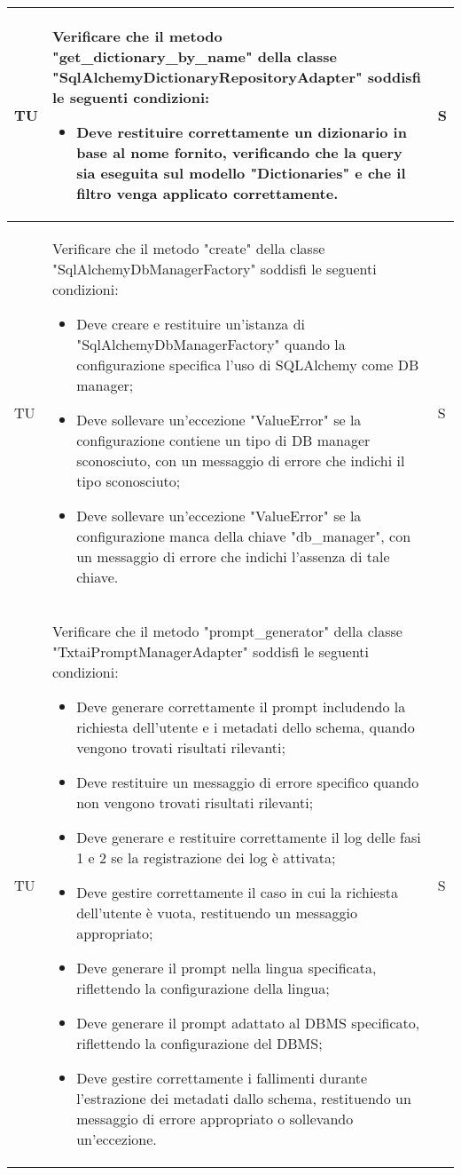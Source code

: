 \begin{adjustwidth}{-0.5cm}{-0.5cm}
\begin{longtable}{|P{1.5cm}|>{\raggedright}P{9.5cm}|>{\arraybackslash}P{1.5cm}|}
		\hline TU & Verificare che il metodo "get\_dictionary\_by\_name" della classe "SqlAlchemyDictionaryRepositoryAdapter" soddisfi le seguenti condizioni:
		\begin{itemize}
			\item Deve restituire correttamente un dizionario in base al nome fornito, verificando che la query sia eseguita sul modello "Dictionaries" e che il filtro venga applicato correttamente.
		\end{itemize} & S \\

		\hline TU & Verificare che il metodo "create" della classe "SqlAlchemyDbManagerFactory" soddisfi le seguenti condizioni:
		\begin{itemize}
			\item Deve creare e restituire un'istanza di "SqlAlchemyDbManagerFactory" quando la configurazione specifica l'uso di SQLAlchemy come DB manager;
			\item Deve sollevare un'eccezione "ValueError" se la configurazione contiene un tipo di DB manager sconosciuto, con un messaggio di errore che indichi il tipo sconosciuto;
			\item Deve sollevare un'eccezione "ValueError" se la configurazione manca della chiave "db\_manager", con un messaggio di errore che indichi l'assenza di tale chiave.
		\end{itemize} & S \\

		\hline TU & Verificare che il metodo "prompt\_generator" della classe "TxtaiPromptManagerAdapter" soddisfi le seguenti condizioni:
		\begin{itemize}
			\item Deve generare correttamente il prompt includendo la richiesta dell'utente e i metadati dello schema, quando vengono trovati risultati rilevanti;
			\item Deve restituire un messaggio di errore specifico quando non vengono trovati risultati rilevanti;
			\item Deve generare e restituire correttamente il log delle fasi 1 e 2 se la registrazione dei log è attivata;
			\item Deve gestire correttamente il caso in cui la richiesta dell'utente è vuota, restituendo un messaggio appropriato;
			\item Deve generare il prompt nella lingua specificata, riflettendo la configurazione della lingua;
			\item Deve generare il prompt adattato al DBMS specificato, riflettendo la configurazione del DBMS;
			\item Deve gestire correttamente i fallimenti durante l'estrazione dei metadati dallo schema, restituendo un messaggio di errore appropriato o sollevando un'eccezione.
		\end{itemize} & S \\


\end{longtable}
\end{adjustwidth}
